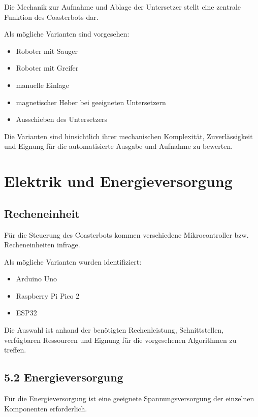 Die Mechanik zur Aufnahme und Ablage der Untersetzer stellt eine
zentrale Funktion des Coasterbots dar.

Als mögliche Varianten sind vorgesehen:

\begin{itemize}
\tightlist
\item
  Roboter mit Sauger
\item
  Roboter mit Greifer
\item
  manuelle Einlage
\item
  magnetischer Heber bei geeigneten Untersetzern
\item
  Ausschieben des Untersetzers
\end{itemize}

Die Varianten sind hinsichtlich ihrer mechanischen Komplexität,
Zuverlässigkeit und Eignung für die automatisierte Ausgabe und Aufnahme
zu bewerten.

\section{Elektrik und
Energieversorgung}\label{elektrik-und-energieversorgung}

\subsection{Recheneinheit}\label{recheneinheit}

Für die Steuerung des Coasterbots kommen verschiedene Mikrocontroller
bzw. Recheneinheiten infrage.

Als mögliche Varianten wurden identifiziert:

\begin{itemize}
\tightlist
\item
  Arduino Uno
\item
  Raspberry Pi Pico 2
\item
  ESP32
\end{itemize}

Die Auswahl ist anhand der benötigten Rechenleistung, Schnittstellen,
verfügbaren Ressourcen und Eignung für die vorgesehenen Algorithmen zu
treffen.

\subsection{5.2 Energieversorgung}\label{energieversorgung}

Für die Energieversorgung ist eine geeignete Spannungsversorgung der
einzelnen Komponenten erforderlich.

